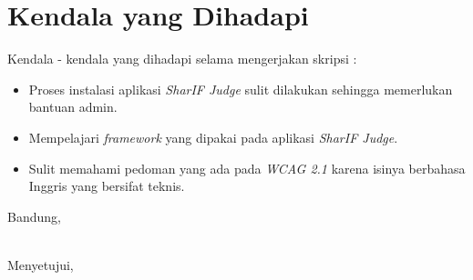 \documentclass[a4paper,twoside]{article}
\begin{document}
\section{Kendala yang Dihadapi}
Kendala - kendala yang dihadapi selama mengerjakan skripsi :
\begin{itemize}
	\item Proses instalasi aplikasi \textit{SharIF Judge} sulit dilakukan sehingga memerlukan bantuan admin.
	\item Mempelajari \textit{framework} yang dipakai pada aplikasi \textit{SharIF Judge}.
	\item Sulit memahami pedoman yang ada pada \textit{WCAG 2.1} karena isinya berbahasa Inggris yang bersifat teknis.
\end{itemize}

\vspace{1cm}
\centering Bandung, \tanggal\\
\vspace{2cm} \nama \\ 
\vspace{1cm}

Menyetujui, \\
\end{document}

